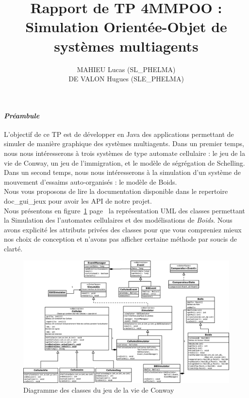 \documentclass[a4paper, 10pt, french]{article}
\title{Rapport de TP 4MMPOO : Simulation Orientée-Objet de systèmes multiagents }
\author{
MAHIEU Lucas (SL\_PHELMA) 
\\ DE VALON Hugues (SLE\_PHELMA) 
}
\begin{document}
\maketitle

\paragraph{\em Préambule}
{L’objectif de ce TP est de développer en Java des applications permettant de simuler de manière graphique des systèmes multiagents. Dans un premier temps, nous nous intéresserons à trois systèmes de type automate cellulaire : le jeu de la vie de Conway, un jeu de l’immigration, et le modèle de ségrégation de Schelling. Dans un second temps, nous nous intéresserons à la simulation d’un système de mouvement d’essaims auto-organisés : le modèle de Boids.
\\Nous vous proposons de lire la documentation disponible dans le repertoire doc\_gui\_jeux pour avoir les API de notre projet.
\\Nous présentons en figure~\ref{étiquette} page~\pageref{étiquette} la représentation UML des classes permettant la Simulation des l'automates cellulaires et des modélisations de {\em Boids}. Nous avons explicité les attributs privées des classes pour que vous compreniez mieux nos choix de conception et n'avons pas afficher certaine méthode par soucis de clarté.
}
\begin{figure}[h]
\hspace{-20mm} 
	\includegraphics[scale=0.27]{UML_Cellules.eps}
	\caption{\label{étiquette} Diagramme des classes du jeu de la vie de Conway}
\end{figure}
\end{document}
